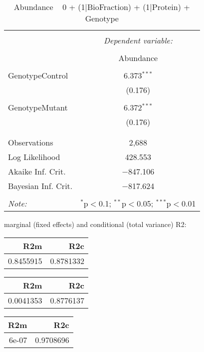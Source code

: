 \documentclass[11pt]{report}
\begin{document}
\begin{table}[!htbp] \centering 
  \caption{Abundance ~ 0 + (1|BioFraction) + (1|Protein) + Genotype} 
  \label{} 
\begin{tabular}{@{\extracolsep{5pt}}lc} 
\\[-1.8ex]\hline 
\hline \\[-1.8ex] 
 & \multicolumn{1}{c}{\textit{Dependent variable:}} \\ 
\cline{2-2} 
\\[-1.8ex] & Abundance \\ 
\hline \\[-1.8ex] 
 GenotypeControl & 6.373$^{***}$ \\ 
  & (0.176) \\ 
  & \\ 
 GenotypeMutant & 6.372$^{***}$ \\ 
  & (0.176) \\ 
  & \\ 
\hline \\[-1.8ex] 
Observations & 2,688 \\ 
Log Likelihood & 428.553 \\ 
Akaike Inf. Crit. & $-$847.106 \\ 
Bayesian Inf. Crit. & $-$817.624 \\ 
\hline 
\hline \\[-1.8ex] 
\textit{Note:}  & \multicolumn{1}{r}{$^{*}$p$<$0.1; $^{**}$p$<$0.05; $^{***}$p$<$0.01} \\ 
\end{tabular} 
\end{table} 
marginal (fixed effects) and conditional (total variance) R2:

\begin{tabular}{r|r}
\hline
R2m & R2c\\
\hline
0.8455915 & 0.8781332\\
\hline
\end{tabular}

\begin{tabular}{r|r}
\hline
R2m & R2c\\
\hline
0.0041353 & 0.8776137\\
\hline
\end{tabular}

\begin{tabular}{r|r}
\hline
R2m & R2c\\
\hline
6e-07 & 0.9708696\\
\hline
\end{tabular}
\end{document}
